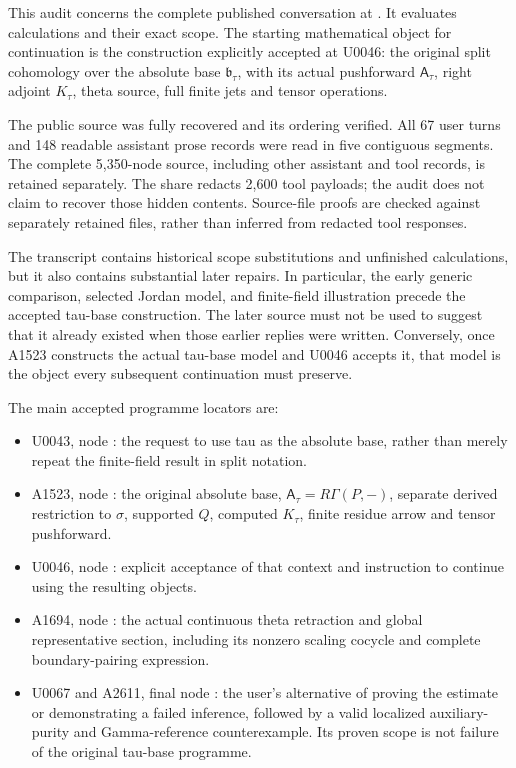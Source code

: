 \documentclass[10pt,a4paper,oneside]{report}
\providecommand{\tightlist}{\setlength{\itemsep}{0pt}\setlength{\parskip}{0pt}}
\begin{document}
This audit concerns the complete published conversation at
\href{https://chatgpt.com/share/6aa6bc6e-98cc-83eb-9343-e811c26d6631}{\protect{}}.
It evaluates calculations and their exact scope. The starting
mathematical object for continuation is the construction explicitly
accepted at U0046: the original split cohomology over the absolute base
\(\mathfrak b_\tau\), with its actual pushforward \(\mathsf A_\tau\),
right adjoint \(K_\tau\), theta source, full finite jets and tensor
operations.

The public source was fully recovered and its ordering verified. All 67
user turns and 148 readable assistant prose records were read in five
contiguous segments. The complete 5,350-node source, including other
assistant and tool records, is retained separately. The share redacts
2,600 tool payloads; the audit does not claim to recover those hidden
contents. Source-file proofs are checked against separately retained
files, rather than inferred from redacted tool responses.

The transcript contains historical scope substitutions and unfinished
calculations, but it also contains substantial later repairs. In
particular, the early generic comparison, selected Jordan model, and
finite-field illustration precede the accepted tau-base construction.
The later source must not be used to suggest that it already existed
when those earlier replies were written. Conversely, once A1523
constructs the actual tau-base model and U0046 accepts it, that model is
the object every subsequent continuation must preserve.

The main accepted programme locators are:

\begin{itemize}
\tightlist
\item
  U0043, node \protect{}: the
  request to use tau as the absolute base, rather than merely repeat the
  finite-field result in split notation.
\item
  A1523, node \protect{}: the
  original absolute base, \(\mathsf A_\tau=R\Gamma(P,-)\), separate
  derived restriction to \(\sigma\), supported \(Q\), computed
  \(K_\tau\), finite residue arrow and tensor pushforward.
\item
  U0046, node \protect{}:
  explicit acceptance of that context and instruction to continue using
  the resulting objects.
\item
  A1694, node \protect{}: the
  actual continuous theta retraction and global representative section,
  including its nonzero scaling cocycle and complete boundary-pairing
  expression.
\item
  U0067 and A2611, final node
  \protect{}: the user's
  alternative of proving the estimate or demonstrating a failed
  inference, followed by a valid localized auxiliary-purity and
  Gamma-reference counterexample. Its proven scope is not failure of the
  original tau-base programme.
\end{itemize}
\end{document}

